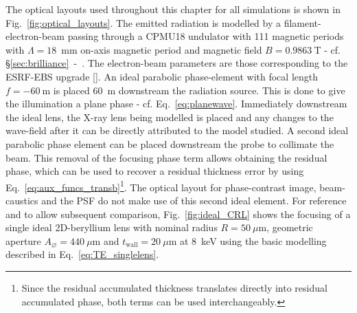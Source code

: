 \begin{refsection}
The optical layouts used throughout this chapter for all simulations is shown in Fig.~\ref{fig:optical_layouts}. The emitted radiation is modelled by a filament-electron-beam passing through a CPMU18 undulator with 111 magnetic periods with $\Lambda=18$~mm on-axis magnetic period and magnetic field $B=0.9863~$T - cf. \S\ref{sec:brilliance}~-~\textit{}. The electron-beam parameters are those corresponding to the ESRF-EBS upgrade [\cite{orangebook}]. An ideal parabolic phase-element with focal length $f=-60~$m is placed 60~m downstream the radiation source. This is done to give the illumination a plane phase - cf. Eq.~\ref{eq:planewave}. Immediately downstream the ideal lens, the X-ray lens being modelled is placed and any changes to the wave-field after it can be directly attributed to the model studied. A second ideal parabolic phase element can be placed downstream the probe to collimate the beam. This removal of the focusing phase term allows obtaining the residual phase, which can be used to recover a residual thickness error by using Eq.~\ref{eq:aux_funcs_transb}\footnote{Since the residual accumulated thickness translates directly into residual accumulated phase, both terms can be used interchangeably.}. The optical layout for phase-contrast image, beam-caustics and the PSF do not make use of this second ideal element. For reference and to allow subsequent comparison, Fig.~\ref{fig:ideal_CRL} shows the focusing of a single ideal 2D-beryllium lens with nominal radius $R=50~\mu\text{m}$, geometric aperture $A_{\diameter}=440~\mu\text{m}$ and $t_\text{wall}=20~\mu$m at 8~keV using the basic modelling described in Eq.~\ref{eq:TE_singlelens}.


\end{refsection}
